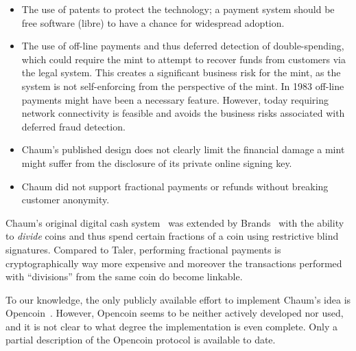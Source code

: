 \documentclass{llncs}
\begin{document}
\begin{itemize}
 \item The use of patents to protect the technology; a payment system
   should be free software (libre) to have a chance for widespread adoption.
 \item The use of off-line payments and thus deferred detection of
   double-spending, which could require the mint to attempt to recover
   funds from customers via the legal system.  This creates a
   significant business risk for the mint, as the system is not
   self-enforcing from the perspective of the mint.  In 1983 off-line
   payments might have been a necessary feature.  However, today
   requiring network connectivity is feasible and avoids the business
   risks associated with deferred fraud detection.
 \item %
   Chaum's published design does not clearly
   limit the financial damage a mint might suffer from the
   disclosure of its private online signing key.
 \item Chaum did not support fractional payments or refunds without
   breaking customer anonymity.
\end{itemize}

Chaum's original digital cash system~\cite{chaum1983blind} was
extended by Brands~\cite{brands1993efficient} with the ability to {\em
  divide} coins and thus spend certain fractions of a coin using
restrictive blind signatures.  Compared to Taler, performing
fractional payments is cryptographically way more expensive and
moreover the transactions performed with ``divisions'' from the same
coin do become linkable.
%
%

To our knowledge, the only publicly available effort to implement
Chaum's idea is Opencoin~\cite{dent2008extensions}.  However, Opencoin
seems to be neither actively developed nor used, and it is not clear
to what degree the implementation is even complete.  Only a partial
description of the Opencoin protocol is available to date.
\end{document}
